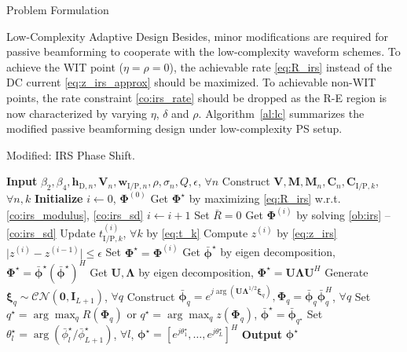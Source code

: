 \documentclass[journal]{IEEEtran}
\begin{document}
\begin{section}{Problem Formulation}
\begin{subsection}{Low-Complexity Adaptive Design}
			Besides, minor modifications are required for passive beamforming to cooperate with the low-complexity waveform schemes. To achieve the WIT point ($\eta=\rho=0$), the achievable rate \eqref{eq:R_irs} instead of the DC current \eqref{eq:z_irs_approx} should be maximized. To achievable non-WIT points, the rate constraint \eqref{co:irs_rate} should be dropped as the R-E region is now characterized by varying $\eta$, $\delta$ and $\rho$. Algorithm~\ref{al:lc} summarizes the modified passive beamforming design under low-complexity PS setup.

			\begin{algorithm}[!t]
				\caption{Modified: IRS Phase Shift.}
				\label{al:lc}
				\begin{algorithmic}[1]
					\State \textbf{Input} $\beta_2,\beta_4,\boldsymbol{h}_{\mathrm{D},n},\boldsymbol{V}_{n},\boldsymbol{w}_{\mathrm{I/P},n},\rho,\sigma_n,Q,\epsilon$, $\forall n$
					\State Construct $\boldsymbol{V},\boldsymbol{M},\boldsymbol{M}_n,\boldsymbol{C}_{n},\boldsymbol{C}_{\mathrm{I/P},k}$, $\forall n,k$
					\State \textbf{Initialize} $i \gets 0$, $\boldsymbol{\Phi}^{(0)}$
						\State Get $\boldsymbol{\Phi}^{\star}$ by maximizing \eqref{eq:R_irs} w.r.t. \eqref{co:irs_modulus}, \eqref{co:irs_sd}
					\Else
						\Repeat
							\State $i \gets i + 1$
								\State Set $\bar{R}=0$
								\State Get $\boldsymbol{\Phi}^{(i)}$ by solving \ref{ob:irs} -- \ref{co:irs_sd}
								\State Update $t_{\mathrm{I/P},k}^{(i)}$, $\forall k$ by \eqref{eq:t_k}
								\State Compute $z^{(i)}$ by \eqref{eq:z_irs}
						\Until $\lvert z^{(i)}-z^{(i-1)} \rvert \le \epsilon$
						\State Set $\boldsymbol{\Phi}^{\star}=\boldsymbol{\Phi}^{(i)}$
					\EndIf
						\State Get $\bar{\boldsymbol{\phi}}^\star$ by eigen decomposition, $\boldsymbol{\Phi}^{\star}=\bar{\boldsymbol{\phi}}^\star(\bar{\boldsymbol{\phi}}^\star)^H$
					\Else
						\State Get $\boldsymbol{U},\boldsymbol{\Lambda}$ by eigen decomposition, $\boldsymbol{\Phi}^{\star}=\boldsymbol{U}\boldsymbol{\Lambda}\boldsymbol{U}^H$
						\State Generate $\boldsymbol{\xi}_q \sim \mathcal{CN}(\boldsymbol{0},\boldsymbol{I}_{L+1})$, $\forall q$
						\State Construct $\bar{\boldsymbol{\phi}}_q=e^{j\arg\left(\boldsymbol{U}\boldsymbol{\Lambda}^{1/2}\boldsymbol{\xi}_q\right)},\boldsymbol{\Phi}_q=\bar{\boldsymbol{\phi}}_q\bar{\boldsymbol{\phi}}_q^H$, $\forall q$
						\State Set $q^{\star}=\arg\max_q{R(\boldsymbol{\Phi}_q)}$ or $q^{\star}=\arg\max_q{z(\boldsymbol{\Phi}_q)}$, $\bar{\boldsymbol{\phi}}^\star=\bar{\boldsymbol{\phi}}_{q^{\star}}$
					\EndIf
					\State Set $\theta_l^\star=\arg(\bar{\phi}_l^\star/\bar{\phi}_{L+1}^\star)$, $\forall l$, $\boldsymbol{\phi}^{\star}=[e^{j\theta_1^\star},\dots,e^{j\theta_L^\star}]^H$
					\State \textbf{Output} $\boldsymbol{\phi}^{\star}$
				\end{algorithmic}
			\end{algorithm}


\end{subsection}
\end{section}
\end{document}
